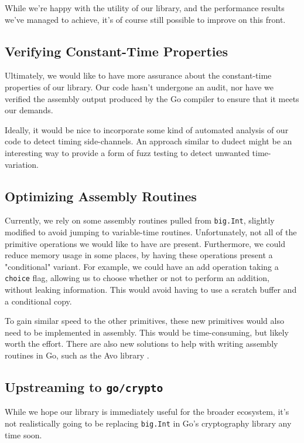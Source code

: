 \documentclass[11pt, a4paper]{article} %
\begin{document}
{While we're happy with the utility of our library,
and the performance results we've managed to achieve, it's
of course still possible to improve on this front.

\subsection{Verifying Constant-Time Properties}

Ultimately, we would like to have more assurance about the
constant-time properties of our library. Our code hasn't
undergone an audit, nor have we verified the assembly output
produced by the Go compiler to ensure that it meets our demands.

Ideally, it would be nice to incorporate some kind of automated
analysis of our code to detect timing side-channels. An approach
similar to dudect
\cite{reparaz_dude_2017} 
might be an interesting way to provide a form of fuzz testing
to detect unwanted time-variation.

\subsection{Optimizing Assembly Routines}

Currently, we rely on some assembly routines pulled from
\texttt{big.Int}, slightly modified to avoid jumping to variable-time
routines. Unfortunately, not all of the primitive operations we would
like to have are present. Furthermore, we could reduce memory usage
in some places, by having these operations present a "conditional"
variant. For example, we could have an add operation taking a
\texttt{choice} flag, allowing us to choose whether or not to perform
an addition, without leaking information. This would avoid having
to use a scratch buffer and a conditional copy.

To gain similar speed to the other primitives, these new primitives
would also need to be implemented in assembly. This would be time-consuming,
but likely worth the effort. There are also new solutions
to help with writing assembly routines in Go, such as the Avo library
\cite{mcloughlin_mmcloughlinavo_2021}.

\subsection{Upstreaming to \texttt{go/crypto}}

While we hope our library is immediately useful for the broader
ecosystem, it's not realistically going to be replacing
\texttt{big.Int} in Go's cryptography library any time soon.

}
\end{document}
